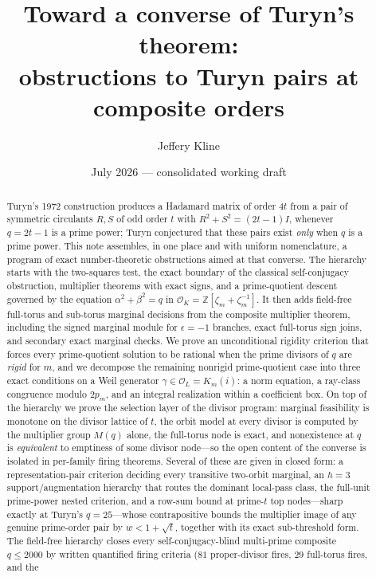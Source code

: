 \documentclass[11pt]{article}
\title{Toward a converse of Turyn's theorem:\\
obstructions to Turyn pairs at composite orders}
\author{Jeffery Kline}
\date{July 2026 --- consolidated working draft}
\theoremstyle{plain}
\theoremstyle{definition}
\theoremstyle{remark}
\newcommand{\Z}{\mathbb Z}
\newcommand{\OK}{\mathcal O_K}
\newcommand{\OL}{\mathcal O_L}
\begin{document}
\maketitle

\begin{abstract}
Turyn's 1972 construction produces a Hadamard matrix of order $4t$ from a pair
of symmetric circulants $R,S$ of odd order $t$ with $R^2+S^2=(2t-1)I$, whenever
$q=2t-1$ is a prime power; Turyn conjectured that these pairs exist \emph{only}
when $q$ is a prime power. This note assembles, in one place and with uniform
nomenclature, a program of exact number-theoretic obstructions aimed at that
converse. The hierarchy starts with the two-squares test, the exact boundary of
the classical self-conjugacy obstruction, multiplier theorems with exact signs,
and a prime-quotient descent governed by the equation
$\alpha^2+\beta^2=q$ in $\OK=\Z[\zeta_m+\zeta_m^{-1}]$. It then adds
field-free full-torus and sub-torus marginal decisions from the composite
multiplier theorem, including the signed marginal module for $\epsilon=-1$
branches, exact full-torus sign joins, and secondary exact marginal checks. We
prove an unconditional rigidity criterion that forces every prime-quotient
solution to be rational when the prime divisors of $q$ are \emph{rigid} for
$m$, and we decompose the remaining nonrigid prime-quotient case into three
exact conditions on a Weil generator $\gamma\in\OL=K_m(i)$: a norm equation, a
ray-class congruence modulo $2p_m$, and an integral realization within a
coefficient box. On top of the hierarchy we prove the selection layer of
the divisor program: marginal feasibility is monotone on the divisor
lattice of $t$, the orbit model at every divisor is computed by the
multiplier group $M(q)$ alone, the full-torus node is exact, and
nonexistence at $q$ is \emph{equivalent} to emptiness of some divisor
node---so the open content of the converse is isolated in per-family
firing theorems.  Several of these are given in closed form: a
representation-pair criterion deciding every transitive two-orbit
marginal, an $h=3$ support/augmentation hierarchy that routes the
dominant local-pass class, the full-unit prime-power nested criterion,
and a row-sum bound at prime-$t$ top nodes---sharp exactly at Turyn's
$q=25$---whose contrapositive bounds the multiplier image of any genuine
prime-order pair by $w<1+\sqrt t$, together with its exact sub-threshold
form.  The field-free hierarchy closes every self-conjugacy-blind
multi-prime composite $q\le2000$ by written quantified firing criteria
($81$ proper-divisor fires, $29$ full-torus fires, and the

\end{abstract}
\end{document}
